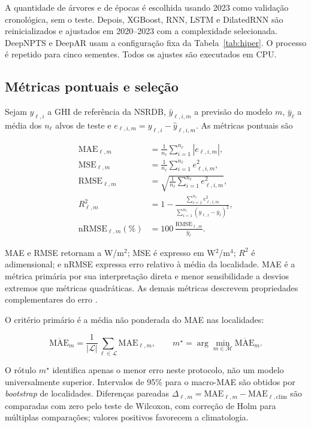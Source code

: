 \documentclass[10pt,conference,a4paper]{IEEEtran}
\begin{document}
A quantidade de árvores e de épocas é escolhida usando 2023 como validação
cronológica, sem o teste. Depois, XGBoost, RNN, LSTM e DilatedRNN são
reinicializados e ajustados em 2020--2023 com a complexidade selecionada.
DeepNPTS e DeepAR usam a configuração fixa da Tabela~\ref{tab:hiper}. O
processo é repetido para cinco sementes. Todos os ajustes são executados em CPU.

\subsection{Métricas pontuais e seleção}

Sejam $y_{\ell,i}$ a GHI de referência da NSRDB,
$\widehat y_{\ell,i,m}$ a previsão do modelo $m$, $\bar y_\ell$ a média dos
$n_\ell$ alvos de teste e $e_{\ell,i,m}=y_{\ell,i}-\widehat y_{\ell,i,m}$. As
métricas pontuais são

\begin{align}
 \mathrm{MAE}_{\ell,m}
 &=\frac{1}{n_\ell}\sum_{i=1}^{n_\ell}|e_{\ell,i,m}|,
 \label{eq:mae}\\
 \mathrm{MSE}_{\ell,m}
 &=\frac{1}{n_\ell}\sum_{i=1}^{n_\ell}e_{\ell,i,m}^{2},
 \label{eq:mse}\\
 \mathrm{RMSE}_{\ell,m}
 &=\sqrt{\frac{1}{n_\ell}\sum_{i=1}^{n_\ell}e_{\ell,i,m}^{2}},
 \label{eq:rmse}\\
 R^2_{\ell,m}
 &=1-\frac{\sum_{i=1}^{n_\ell}e_{\ell,i,m}^{2}}
 {\sum_{i=1}^{n_\ell}(y_{\ell,i}-\bar y_\ell)^2},
 \label{eq:r2}\\
 \mathrm{nRMSE}_{\ell,m}(\%)
 &=100\,\frac{\mathrm{RMSE}_{\ell,m}}{\bar y_\ell}.
 \label{eq:nrmse}
\end{align}

MAE e RMSE retornam a W/m$^2$; MSE é expresso em
W$^2$/m$^4$; $R^2$ é adimensional; e nRMSE expressa erro relativo à média da
localidade. MAE é a métrica primária por sua interpretação direta e menor
sensibilidade a desvios extremos que métricas quadráticas. As demais métricas
descrevem propriedades complementares do erro \cite{hyndman2006}.

O critério primário é a média não ponderada do MAE nas localidades:

\begin{equation}
 \overline{\mathrm{MAE}}_m=\frac{1}{|\mathcal L|}
 \sum_{\ell\in\mathcal L}\mathrm{MAE}_{\ell,m},
 \qquad
 m^\star=\arg\min_{m\in\mathcal M}\overline{\mathrm{MAE}}_m.
 \label{eq:macro}
\end{equation}

O rótulo $m^\star$ identifica apenas o menor erro neste protocolo, não um
modelo universalmente superior. Intervalos de 95\% para o macro-MAE são obtidos
por \textit{bootstrap} de localidades. Diferenças pareadas
$\Delta_{\ell,m}=\mathrm{MAE}_{\ell,m}-\mathrm{MAE}_{\ell,\mathrm{clim}}$ são
comparadas com zero pelo teste de Wilcoxon, com correção de Holm para múltiplas
comparações; valores positivos favorecem a climatologia.
\end{document}
